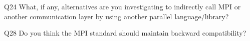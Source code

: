 \begin{description}%
\item{Q24} What, if any, alternatives are you investigating to indirectly call MPI or another communication layer by using another parallel language/library?%
\item{Q28} Do you think the MPI standard should maintain backward compatibility?%
\end{description}%
